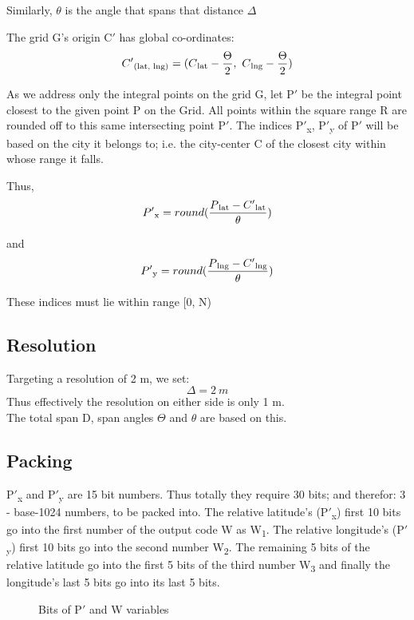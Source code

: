 \documentclass[conference]{IEEEtran}
\begin{document}
Similarly, $\theta$ is the angle that spans that distance $\Delta$

The grid G's origin C$'$ has global co-ordinates:
\begin{equation}C'\textsubscript{(lat, lng)} = ( C\textsubscript{lat} - \frac{\Theta}{2},\ C\textsubscript{lng} - \frac{\Theta}{2})\end{equation}

As we address only the integral points on the grid G, let P$'$ be the integral point closest to the given point P on the Grid.
All points within the square range R are rounded off to this same intersecting point P$'$.
The indices P$'$\textsubscript{x}, P$'$\textsubscript{y} of P$'$ will be based on the city it belongs to;
i.e. the city-center C of the closest city within whose range it falls.


Thus, \begin{equation}P'\textsubscript{x} = round(\frac{P\textsubscript{lat} - C'\textsubscript{lat}} {\theta})\end{equation}

and \begin{equation}P'\textsubscript{y}= round(\frac{P\textsubscript{lng} - C'\textsubscript{lng}} {\theta})\end{equation}

These indices must lie within range [0, N)

\subsection{Resolution}
Targeting a resolution of 2 m, we set:
\begin{equation}\Delta = 2 \ m\end{equation}
Thus effectively the resolution on either side is only 1 m.\\
The total span D, span angles $\Theta$ and {$\theta$} are based on this.

\subsection{Packing}
P$'$\textsubscript{x} and P$'$\textsubscript{y} are 15 bit numbers.
Thus totally they require 30 bits; and therefor: 3 - base-1024 numbers, to be packed into.
The relative latitude's (P$'$\textsubscript{x}) first 10 bits go into the first number of the output code W as W\textsubscript{1}. The relative longitude's (P$'$\textsubscript{y}) first 10 bits go into the second number W\textsubscript{2}. The remaining 5 bits of the relative latitude go into the first 5 bits of the third number W\textsubscript{3} and finally the longitude's last 5 bits go into its last 5 bits.
\begin{figure}[H]
\centerline{}
\caption{Bits of P$'$ and W variables}
\label{Packing}
\end{figure}
\end{document}
